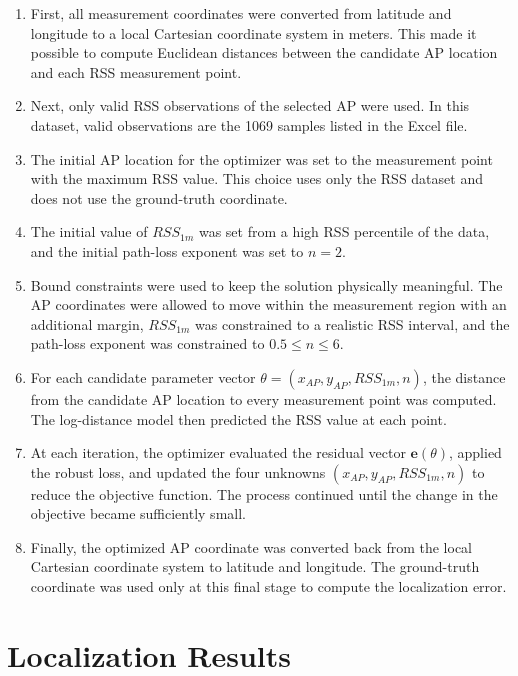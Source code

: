 \documentclass[11pt,a4paper]{article}
\begin{document}
\begin{enumerate}
\item First, all measurement coordinates were converted from latitude and
longitude to a local Cartesian coordinate system in meters. This made it possible
to compute Euclidean distances between the candidate AP location and each RSS
measurement point.

\item Next, only valid RSS observations of the selected AP were used. In this
dataset, valid observations are the 1069 samples listed in the Excel file.

\item The initial AP location for the optimizer was set to the measurement point
with the maximum RSS value. This choice uses only the RSS dataset and does not
use the ground-truth coordinate.

\item The initial value of \(RSS_{1m}\) was set from a high RSS percentile of the
data, and the initial path-loss exponent was set to \(n=2\).

\item Bound constraints were used to keep the solution physically meaningful.
The AP coordinates were allowed to move within the measurement region with an
additional margin, \(RSS_{1m}\) was constrained to a realistic RSS interval, and
the path-loss exponent was constrained to \(0.5 \le n \le 6\).

\item For each candidate parameter vector
\(\theta=(x_{AP},y_{AP},RSS_{1m},n)\), the distance from the candidate AP
location to every measurement point was computed. The log-distance model then
predicted the RSS value at each point.

\item At each iteration, the optimizer evaluated the residual vector
\(\mathbf{e}(\theta)\), applied the robust loss, and updated the four unknowns
\((x_{AP},y_{AP},RSS_{1m},n)\) to reduce the objective function. The process
continued until the change in the objective became sufficiently small.

\item Finally, the optimized AP coordinate was converted back from the local
Cartesian coordinate system to latitude and longitude. The ground-truth
coordinate was used only at this final stage to compute the localization error.
\end{enumerate}

\section{Localization Results}
\end{document}
